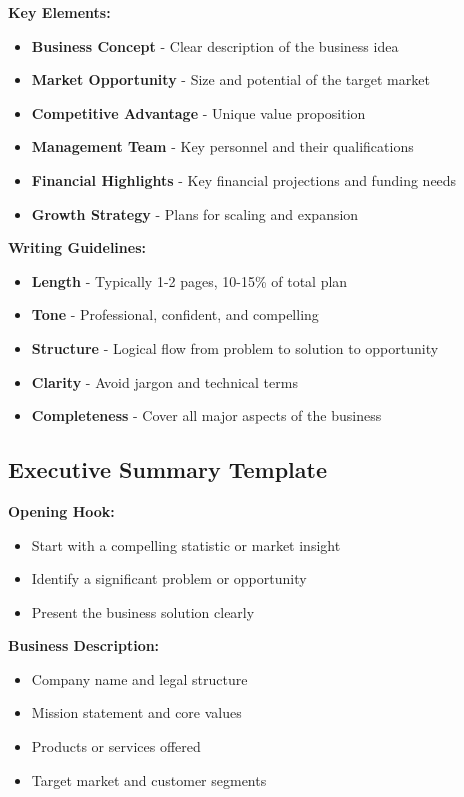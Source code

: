 \documentclass[12pt]{article}
\begin{document}
\textbf{Key Elements:}
\begin{itemize}
    \item \textbf{Business Concept} - Clear description of the business idea
    \item \textbf{Market Opportunity} - Size and potential of the target market
    \item \textbf{Competitive Advantage} - Unique value proposition
    \item \textbf{Management Team} - Key personnel and their qualifications
    \item \textbf{Financial Highlights} - Key financial projections and funding needs
    \item \textbf{Growth Strategy} - Plans for scaling and expansion
\end{itemize}

\textbf{Writing Guidelines:}
\begin{itemize}
    \item \textbf{Length} - Typically 1-2 pages, 10-15\% of total plan
    \item \textbf{Tone} - Professional, confident, and compelling
    \item \textbf{Structure} - Logical flow from problem to solution to opportunity
    \item \textbf{Clarity} - Avoid jargon and technical terms
    \item \textbf{Completeness} - Cover all major aspects of the business
\end{itemize}

\subsection{Executive Summary Template}

\textbf{Opening Hook:}
\begin{itemize}
    \item Start with a compelling statistic or market insight
    \item Identify a significant problem or opportunity
    \item Present the business solution clearly
\end{itemize}

\textbf{Business Description:}
\begin{itemize}
    \item Company name and legal structure
    \item Mission statement and core values
    \item Products or services offered
    \item Target market and customer segments
\end{itemize}
\end{document}
